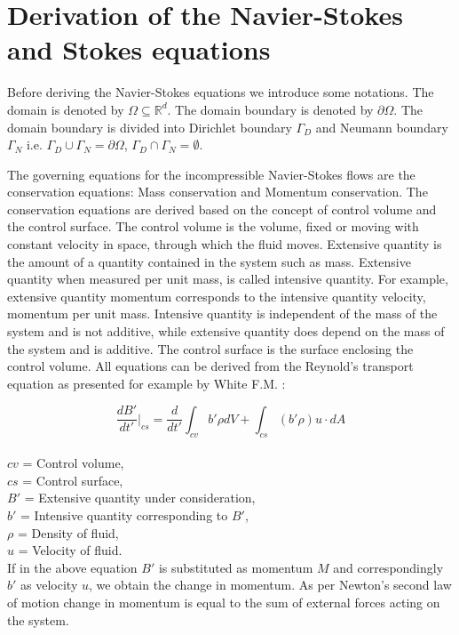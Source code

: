 \documentclass[a4paper,oneside,openright,spanish,english]{book}
\begin{document}
\section[Derivation]{Derivation of the Navier-Stokes and Stokes equations}

Before deriving the Navier-Stokes equations we introduce some notations. The domain is denoted by $\Omega \subseteq \mathbb{R}^d $. The domain boundary is denoted by $\partial \Omega$. The domain boundary is divided into Dirichlet boundary $\Gamma_D$ and Neumann boundary $\Gamma_N$ i.e. $\Gamma_D \cup \Gamma_N = \partial \Omega $, $\Gamma_D \cap \Gamma_N = \emptyset $. 

The governing equations for the incompressible Navier-Stokes flows are the conservation equations: Mass conservation and Momentum conservation. The conservation equations are derived based on the concept of control volume and the control surface. The control volume is the volume, fixed or moving with constant velocity in space, through which the fluid moves. Extensive quantity is the amount of a quantity contained in the system such as mass. Extensive quantity when measured per unit mass, is called intensive quantity. For example, extensive quantity momentum corresponds to the intensive quantity velocity, momentum per unit mass. Intensive quantity is independent of the mass of the system and is not additive, while extensive quantity does depend on the mass of the system and is additive. The control surface is the surface enclosing the control volume. All equations can be derived from the Reynold's transport equation as presented for example by White F.M. \cite{white}:


\begin{equation} \label{rtt} 
\frac{dB'}{dt'}|_{cs} = \frac{d}{dt'} \int_{cv} b' \rho dV + \int_{cs} (b' \rho) u\cdot dA 
\end{equation}
{}\\
$cv$ = Control volume,\\
$cs$ = Control surface,\\
$B'$ = Extensive quantity under consideration,\\
$b'$ = Intensive quantity corresponding to $B'$,\\
$\rho$ = Density of fluid,\\
$u$ = Velocity of fluid.\\

If in the above equation $B'$ is substituted as momentum $M$ and correspondingly $b'$ as velocity $u$, we obtain the change in momentum. As per Newton's second law of motion change in momentum is equal to the sum of external forces acting on the system. 
\end{document}
